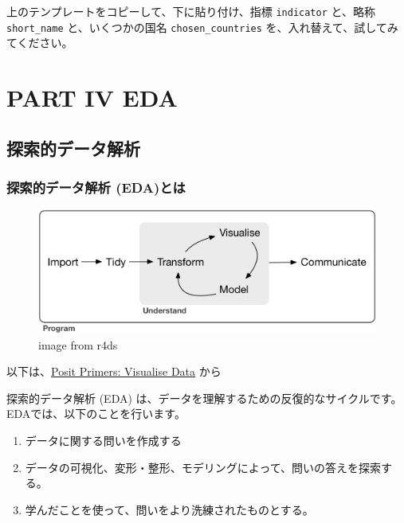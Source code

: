 \documentclass[
  xelatex, ja=standard]{bxjsbook}
\theoremstyle{definition}
\theoremstyle{definition}
\theoremstyle{definition}
\theoremstyle{definition}
\theoremstyle{remark}
\begin{document}
上のテンプレートをコピーして、下に貼り付け、指標 \texttt{indicator} と、略称 \texttt{short\_name} と、いくつかの国名 \texttt{chosen\_countries} を、入れ替えて、試してみてください。

\hypertarget{part-part-iv-eda}{%
\part{PART IV EDA}\label{part-part-iv-eda}}

\hypertarget{intro2eda}{%
\chapter{探索的データ解析}\label{intro2eda}}

\hypertarget{ux63a2ux7d22ux7684ux30c7ux30fcux30bfux89e3ux6790-edaux3068ux306f}{%
\section{探索的データ解析 (EDA)とは}\label{ux63a2ux7d22ux7684ux30c7ux30fcux30bfux89e3ux6790-edaux3068ux306f}}

\begin{figure}
\centering
\includegraphics{./data/data-science.png}
\caption{image from r4ds}
\end{figure}

以下は、\href{https://posit.cloud/learn/primers/3.1}{Posit Primers: Visualise Data} から

探索的データ解析 (EDA) は、データを理解するための反復的なサイクルです。EDAでは、以下のことを行います。

\begin{enumerate}
\def\labelenumi{\arabic{enumi}.}
\item
  データに関する問いを作成する
\item
  データの可視化、変形・整形、モデリングによって、問いの答えを探索する。
\item
  学んだことを使って、問いをより洗練されたものとする。
\end{enumerate}
\end{document}
